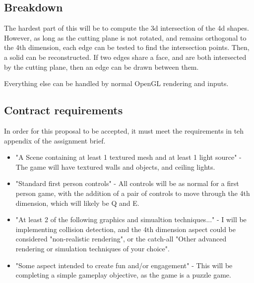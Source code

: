 \documentclass[12pt]{article}
\begin{document}
\subsection{Breakdown}
The hardest part of this will be to compute the 3d intersection of the 4d shapes.
However, as long as the cutting plane is not rotated, and remains orthogonal to the 4th dimension, each edge can be tested to find the intersection points.
Then, a solid can be reconstructed. If two edges share a face, and are both intersected by the cutting plane, then an edge can be drawn between them.

Everything else can be handled by normal OpenGL rendering and inputs.

\subsection{Contract requirements}
In order for this proposal to be accepted, it must meet the requirements in teh appendix of the assignment brief.
\begin{itemize}
    \item "A Scene containing at least 1 textured mesh and at least 1 light source" - The game will have textured walls and objects, and ceiling lights.
    \item "Standard first person controls" - All controls will be as normal for a first person game, with the addition of a pair of controls to move through the 4th dimension, which will likely be Q and E.
    \item "At least 2 of the following graphics and simualtion techniques..." - I will be implementing collision detection, and the 4th dimension aspect could be considered "non-realistic rendering", or the catch-all "Other advanced rendering or simulation techniques of your choice".
    \item "Some aspect intended to create fun and/or engagement" - This will be completing a simple gameplay objective, as the game is a puzzle game.
\end{itemize}
\end{document}
